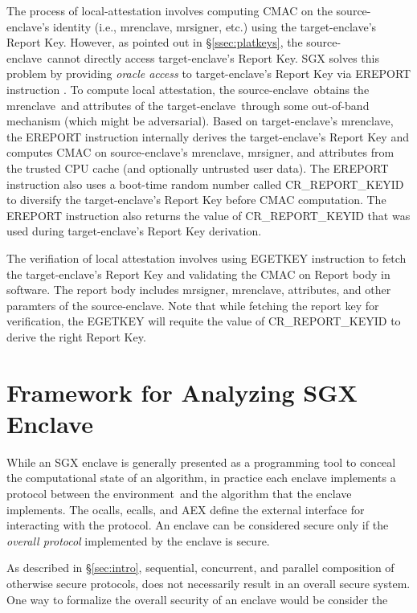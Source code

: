 \documentclass[10pt]{article}
\newcommand{\secref}[1]{\S\ref{#1}}
\newcommand{\ecall}{\textsf{ecall}}
\newcommand{\ocall}{\textsf{ocall}}
\newcommand{\env}{\textsf{environment}}
\newcommand{\mrenclave}{\textsf{mrenclave}}
\newcommand{\mrsigner}{\textsf{mrsigner}}
\newcommand{\se}{source-enclave}
\newcommand{\te}{target-enclave}
\begin{document}
  The process of local-attestation involves computing CMAC
  \cite{aescmac} on the \se's identity (i.e., \mrenclave, \mrsigner,
  etc.) using the \te's Report Key. However, as pointed out in
  \secref{ssec:platkeys}, the \se\ cannot directly access \te's Report
  Key. SGX solves this problem by providing \textit{oracle access} to
  \te's Report Key via \textsf{EREPORT} instruction
  \cite[\S14.4.1]{intelsdm}. To compute local attestation, the
  \se\ obtains the \mrenclave\ and attributes of the \te\ through some
  out-of-band mechanism (which might be adversarial). Based on \te's
  \mrenclave, the \textsf{EREPORT} instruction internally derives the
  \te's Report Key and computes \textsf{CMAC} on \se's \mrenclave,
  \mrsigner, and attributes from the trusted CPU cache (and optionally
  untrusted user data).  The \textsf{EREPORT} instruction also uses a
  boot-time random number called \textsf{CR\_REPORT\_KEYID} to
  diversify the \te's Report Key before \textsf{CMAC} computation. The
  \textsf{EREPORT} instruction also returns the value of
  \textsf{CR\_REPORT\_KEYID} that was used during \te's Report Key
  derivation.

  The verifiation of local attestation involves using \textsf{EGETKEY}
  instruction to fetch the \te's Report Key and validating the
  \textsf{CMAC} on Report body in software.  The report body includes
  \mrsigner, \mrenclave, attributes, and other paramters of the
  \se. Note that while fetching the report key for verification, the
  \textsf{EGETKEY} will requite the value of
  \textsf{CR\_REPORT\_KEYID} to derive the right Report Key.

  \section{Framework for Analyzing SGX Enclave}
  \label{sec:analysisfwk}

  While an SGX enclave is generally presented as a programming tool to
  conceal the computational state of an algorithm, in practice each
  enclave implements a protocol between the \env\ and the algorithm
  that the enclave implements. The \ocall s, \ecall s, and AEX define
  the external interface for interacting with the protocol. An enclave
  can be considered secure only if the \textit{overall protocol}
  implemented by the enclave is secure.

  As described in \secref{sec:intro}, sequential, concurrent, and
  parallel composition of otherwise secure protocols, does not
  necessarily result in an overall secure system. One way to formalize
  the overall security of an enclave would be consider the
\end{document}
